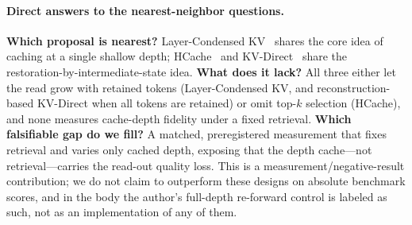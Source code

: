 \paragraph{Direct answers to the nearest-neighbor questions.}
\textbf{Which proposal is nearest?} Layer-Condensed KV~\citep{lckv} shares the
core idea of caching at a single shallow depth; HCache~\citep{hcache} and
KV-Direct~\citep{kvdirect} share the restoration-by-intermediate-state idea.
\textbf{What does it lack?} All three either let the read grow with retained
tokens (Layer-Condensed KV, and reconstruction-based KV-Direct when all tokens
are retained) or omit top-$k$ selection (HCache), and none measures cache-depth
fidelity under a fixed retrieval.  \textbf{Which falsifiable gap do we fill?}
A matched, preregistered measurement that fixes retrieval and varies only
cached depth, exposing that the depth cache---not retrieval---carries the
read-out quality loss.  This is a measurement/negative-result contribution; we
do not claim to outperform these designs on absolute benchmark scores, and in
the body the author's full-depth re-forward control is labeled as such, not as
an implementation of any of them.

